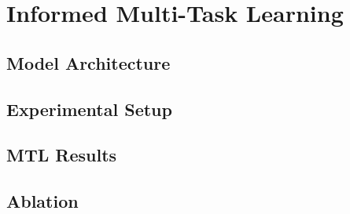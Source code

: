 \chapter{Informed Multi-Task Learning}
\section{Model Architecture}
\section{Experimental Setup}
\section{MTL Results}
\section{Ablation}
